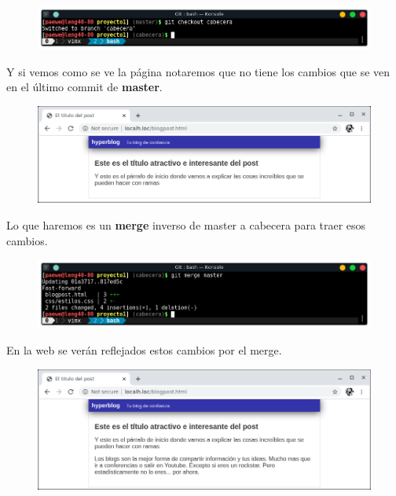 \documentclass{article}
\begin{document}
\begin{figure}[h!]
  \centering
  \includegraphics[scale=0.75]{./Pictures/167_checkout_cabecera.png}
\end{figure}

Y si vemos como se ve la página notaremos que no tiene los cambios que se ven
en el último commit de \textbf{master}.

\begin{figure}[h!]
  \centering
  \includegraphics[scale=0.75]{./Pictures/168_web_cabecera.png}
\end{figure}

Lo que haremos es un \textbf{merge} inverso de master a cabecera para traer
esos cambios.

\begin{figure}[h!]
  \centering
  \includegraphics[scale=0.75]{./Pictures/169_merge_inverso.png}
\end{figure}

En la web se verán reflejados estos cambios por el merge.

\begin{figure}[h!]
  \centering
  \includegraphics[scale=0.75]{./Pictures/170_merge_inverso_web.png}
\end{figure}
\end{document}
